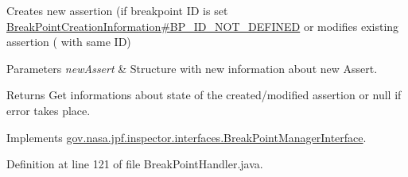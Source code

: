 Creates new assertion (if breakpoint ID is set \hyperlink{interfacegov_1_1nasa_1_1jpf_1_1inspector_1_1interfaces_1_1_break_point_creation_information_a24626231e3744e59f505d0731d4ca9e1}{Break\+Point\+Creation\+Information\#\+B\+P\+\_\+\+I\+D\+\_\+\+N\+O\+T\+\_\+\+D\+E\+F\+I\+N\+ED} or modifies existing assertion ( with same ID) 


\begin{DoxyParams}{Parameters}
{\em new\+Assert} & Structure with new information about new Assert. \\
\hline
\end{DoxyParams}
\begin{DoxyReturn}{Returns}
Get informations about state of the created/modified assertion or null if error takes place. 
\end{DoxyReturn}


Implements \hyperlink{interfacegov_1_1nasa_1_1jpf_1_1inspector_1_1interfaces_1_1_break_point_manager_interface_a835295e3e429bd405ba3acec21f5193e}{gov.\+nasa.\+jpf.\+inspector.\+interfaces.\+Break\+Point\+Manager\+Interface}.



Definition at line 121 of file Break\+Point\+Handler.\+java.


